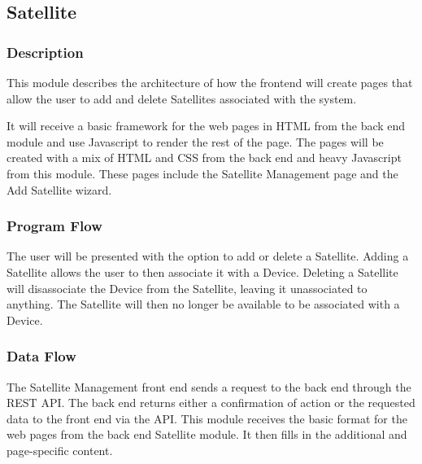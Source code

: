 
\subsection{Satellite}

\subsubsection{Description}

This module describes the architecture of how the frontend will create pages that allow the user to add and delete Satellites associated with the system. 

It will receive a basic framework for the web pages in \ac{HTML} from the back end module and use Javascript to render the rest of the page. 
The pages will be created with a mix of \ac{HTML} and \ac{CSS} from the back end and heavy Javascript from this module. 
These pages include the Satellite Management page and the Add Satellite wizard. 

\subsubsection{Program Flow}

The user will be presented with the option to add or delete a Satellite. 
Adding a Satellite allows the user to then associate it with a Device. 
Deleting a Satellite will disassociate the Device from the Satellite, leaving it unassociated to anything. 
The Satellite will then no longer be available to be associated with a Device. 

\subsubsection{Data Flow}

The Satellite Management front end sends a request to the back end through the \ac{REST} \ac{API}. 
The back end returns either a confirmation of action or the requested data to the front end via the \ac{API}. 
This module receives the basic format for the web pages from the back end Satellite module. 
It then fills in the additional and page-specific content. 


